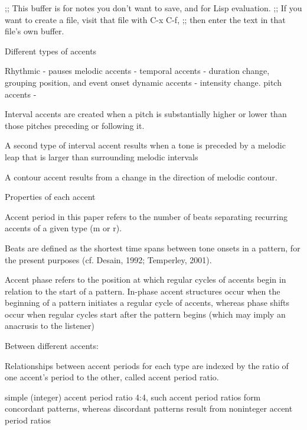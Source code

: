 ;; This buffer is for notes you don't want to save, and for Lisp evaluation.
;; If you want to create a file, visit that file with C-x C-f,
;; then enter the text in that file's own buffer.


Different types of accents

Rhythmic - pauses
melodic accents - 
temporal accents - duration change, grouping position, and event onset
dynamic accents - intensity change.
pitch accents - 

 Interval accents are created when a pitch is substantially higher or lower than those pitches preceding or following it. 

A second type of interval accent results when a tone is preceded by a melodic leap that is larger than surrounding melodic intervals 

A contour accent results from a change in the direction of melodic contour.





Properties of each accent

Accent period in this paper refers to the number of beats separating recurring accents of a given type (m or r). 

Beats are defined as the shortest time spans between tone onsets in
a pattern, for the present purposes (cf. Desain, 1992; Temperley, 2001).

Accent phase refers to the position at which regular cycles of accents begin
in relation to the start of a pattern. In-phase accent structures occur when
the beginning of a pattern initiates a regular cycle of accents, whereas phase
shifts occur when regular cycles start after the pattern begins (which may
imply an anacrusis to the listener)

Between different accents:

Relationships between accent periods for each type are indexed by the ratio of
one accent’s period to the other, called accent period ratio. 

simple (integer) accent period ratio 4:4, such accent period ratios form concordant patterns, whereas discordant patterns result
from noninteger accent period ratios
